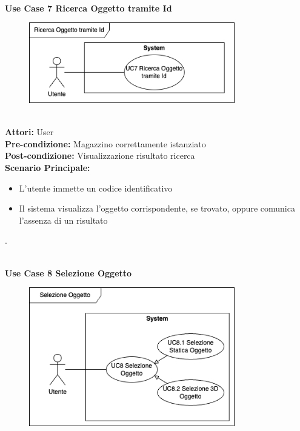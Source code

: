\vspace{0.5cm}

\Large\textbf{}\\
\Large\textbf{Use Case 7 Ricerca Oggetto tramite Id} \\
\vspace{0.5cm}
\begin{figure}[h]
  \centering
  \includegraphics[width=0.8\textwidth]{UseCasesImages/ObjResearchId.drawio.png}
\end{figure}

\large\textbf{} \\
\textbf{Attori:} User\\
\textbf{Pre-condizione:}  Magazzino correttamente istanziato\\
\textbf{Post-condizione: } Visualizzazione risultato ricerca\\
\textbf{Scenario Principale:} \\
\begin{itemize}
  \item L'utente immette un codice identificativo
  \item Il sistema visualizza l'oggetto corrispondente, se trovato, oppure comunica l'assenza di un risultato
\end{itemize}.

\vspace{0.5cm}

\Large\textbf{}\\
\Large\textbf{Use Case 8 Selezione Oggetto} \\
\begin{figure}[h]
  \centering
 \includegraphics[width=0.8\textwidth]{UseCasesImages/ObjSelection.drawio.png}
\end{figure}

